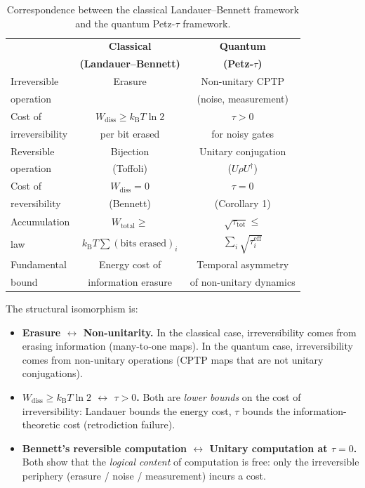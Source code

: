 \documentclass[prl,twocolumn,superscriptaddress,longbibliography]{revtex4-2}
\newcommand{\kB}{k_{\mathrm{B}}}
\newcommand{\tauasym}{\tau}
\begin{document}
\begin{table}[htbp]
\caption{\label{tab:landauer_petz}Correspondence between the
classical Landauer--Bennett framework and the quantum
Petz-$\tauasym$ framework.}
\begin{ruledtabular}
\begin{tabular}{lcc}
& \textbf{Classical} & \textbf{Quantum} \\
& \textbf{(Landauer--Bennett)} & \textbf{(Petz-$\tauasym$)} \\
\colrule
Irreversible & Erasure & Non-unitary CPTP \\
operation & & (noise, measurement) \\
\colrule
Cost of & $W_{\mathrm{diss}} \geq \kB T \ln 2$ & $\tauasym > 0$ \\
irreversibility & per bit erased & for noisy gates \\
\colrule
Reversible & Bijection & Unitary conjugation \\
operation & (Toffoli) & ($U\rho U^\dagger$) \\
\colrule
Cost of & $W_{\mathrm{diss}} = 0$ & $\tauasym = 0$ \\
reversibility & (Bennett) & (Corollary 1) \\
\colrule
Accumulation & $W_{\mathrm{total}} \geq$ & $\sqrt{\tauasym_{\mathrm{tot}}} \leq$ \\
law & $\kB T \sum (\text{bits erased})_i$ &
$\sum_i \sqrt{\tauasym_i^{\mathrm{eff}}}$ \\
\colrule
Fundamental & Energy cost of & Temporal asymmetry \\
bound & information erasure & of non-unitary dynamics \\
\end{tabular}
\end{ruledtabular}
\end{table}

The structural isomorphism is:
\begin{itemize}
\item \textbf{Erasure $\longleftrightarrow$ Non-unitarity.}
  In the classical case, irreversibility comes from erasing
  information (many-to-one maps).  In the quantum case,
  irreversibility comes from non-unitary operations (CPTP maps
  that are not unitary conjugations).
\item \textbf{$W_{\mathrm{diss}} \geq \kB T \ln 2$
  $\longleftrightarrow$ $\tauasym > 0$.}
  Both are \emph{lower bounds} on the cost of irreversibility:
  Landauer bounds the energy cost, $\tauasym$ bounds the
  information-theoretic cost (retrodiction failure).
\item \textbf{Bennett's reversible computation
  $\longleftrightarrow$ Unitary computation at $\tauasym = 0$.}
  Both show that the \emph{logical content} of computation is
  free: only the irreversible periphery (erasure / noise /
  measurement) incurs a cost.
\end{itemize}
\end{document}
